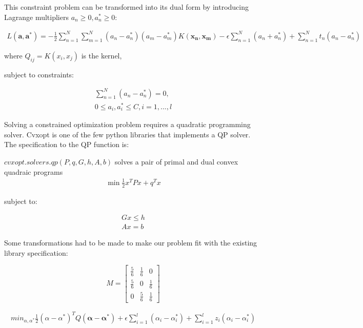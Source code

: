 \documentclass[12pt]{article}
\begin{document}
This constraint problem can be transformed into its dual form  by introducing Lagrange multipliers \(a_n \geq 0, a_n^* \geq 0\):

\begin{gather}
  L(\mathbf{a},\mathbf{a^*}) = -\frac{1}{2}\sum_{n=1}^{N}\sum_{m=1}^{N}(a_n-a_n^*)(a_m-a_m^*)K(\mathbf{x_n},\mathbf{x_m})
  -\epsilon\sum_{n=1}^{N}(a_n+a_n^*) + \sum_{n=1}^{N}t_n(a_n-a_n^*)
 \end{gather}

where \( Q_{ij}=K(x_i,x_j) \) is the kernel,

subject to constraints:

\begin{gather}
  \sum_{n=1}^{N}(a_n-a_n^*)=0,\\
  0\leq a_i, a_i^*\leq C,    i=1,...,l 
\end{gather}

Solving a constrained optimization problem requires a quadratic programming solver. Cvxopt is one of the few python
libraries that implements a QP solver. The specification to the QP function is:

\(cvxopt.solvers.qp(P,q,G,h,A,b)\) solves a pair of primal and dual convex quadraic programs
\begin{gather}
  \min \frac{1}{2} x^T P x + q^T x
\end{gather}

 subject to:

\begin{gather}
 G x \leq h\\
  Ax = b
\end{gather}

Some transformations had to be made to make our problem fit with the existing library specification:

\[M =
\begin{bmatrix}
       \frac{5}{6} & \frac{1}{6} & 0           \\
       \frac{5}{6} & 0           & \frac{1}{6} \\
       0           & \frac{5}{6} & \frac{1}{6}
     \end{bmatrix}
\]

\begin{gather}
 min_{\alpha,\alpha^*} \frac{1}{2}(\alpha-\alpha^*)^T Q (\mathbf{\alpha - \alpha^*})+\epsilon 
\sum_{i=1}^{l}(\alpha_i-\alpha_i^*)+\sum_{i=1}^{l}z_i(\alpha_i-\alpha_i^*)
\end{gather}
\end{document}
